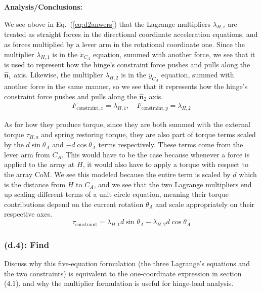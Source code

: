 \documentclass[titlepage]{article}
\begin{document}
\textbf{Analysis/Conclusions:}\\
\begin{mdframed}[linewidth=1pt, innertopmargin=10pt, innerbottommargin=10pt]
	We see above in Eq.~(\ref{eq:d2anwers}) that the Lagrange multipliers $\lambda_{H,i}$ are treated as straight forces in the directional coordinate acceleration equations, and as forces multiplied by a lever arm in the rotational coordinate one. Since the multiplier $\lambda_{H,1}$ is in the $\ddot{x}_{C_A}$ equation, summed with another force, we see that it is used to represent how the hinge's constraint force pushes and pulls along the $\hat{\boldsymbol{n}}_1$ axis. Likewise, the multiplier $\lambda_{H,2}$ is in the $\ddot{y}_{C_A}$ equation, summed with another force in the same manner, so we see that it represents how the hinge's constraint force pushes and pulls along the $\hat{\boldsymbol{n}}_2$ axis.\\
	\begin{equation}
		\begin{split}
			F_{\text{constraint},x}=\lambda_{H,1},\quad 
			F_{\text{constraint},y}=\lambda_{H,2}
		\end{split}
		\label{eq:hingeforce}
	\end{equation}
	
	As for how they produce torque, since they are both summed with the external torque $\tau_{H,a}$ and spring restoring torque, they are also part of torque terms scaled by the $d\sin\theta_A$ and $-d\cos\theta_A$ terms respectively. These terms come from the lever arm from $C_A$. This would have to be the case because whenever a force is applied to the array at $H$, it would also have to apply a torque with respect to the array CoM. We see this modeled because the entire term is scaled by $d$ which is the distance from $H$ to $C_A$, and we see that the two Lagrange multipliers end up scaling different terms of a unit circle equation, meaning their torque contributions depend on the current rotation $\theta_A$ and scale appropriately on their respective axes. 
	\begin{equation}
		\tau_{\text{constraint}}=\lambda_{H,1}d\sin\theta_A-\lambda_{H,2}d\cos\theta_A
		\label{eq:hingetorque}
	\end{equation}
\end{mdframed}

\subsubsection*{(d.4): Find}
Discuss why this five-equation formulation (the three Lagrange's equations and the two constraints) is equivalent to the one-coordinate expression in section (4.1), and why the multiplier formulation is useful for hinge-load analysis.\\
\end{document}
